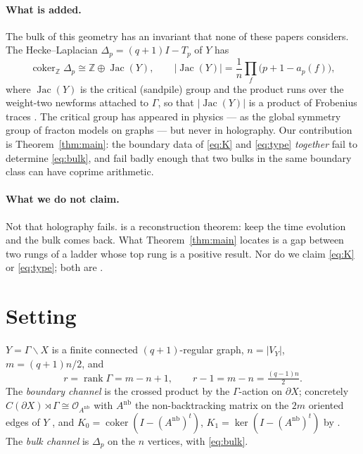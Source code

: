 \documentclass[11pt]{article}
\theoremstyle{plain}
\theoremstyle{remark}
\newcommand{\Z}{\mathbb{Z}}
\newcommand{\Jac}{\operatorname{Jac}}
\begin{document}
\paragraph{What is added.}
The bulk of this geometry has an invariant that none of these papers considers. The
Hecke--Laplacian $\Delta_p=(q{+}1)I-T_p$ of $Y$ has
\begin{equation}\label{eq:bulk}
\operatorname{coker}_\Z\Delta_p\cong\Z\oplus\Jac(Y),
\qquad
|\Jac(Y)|=\frac1n\prod_f\bigl(p+1-a_p(f)\bigr),
\end{equation}
where $\Jac(Y)$ is the critical (sandpile) group \cite{Biggs,BHN} and the product runs over
the weight-two newforms attached to $\Gamma$, so that $|\Jac(Y)|$ is a product of Frobenius
traces \cite[I]{ANCFT}. The critical group has appeared in physics --- as the global
symmetry group of fracton models on graphs \cite{GLS22,GLSS23} --- but never in holography.
Our contribution is Theorem~\ref{thm:main}: the boundary data of \eqref{eq:K} and
\eqref{eq:type} \emph{together} fail to determine \eqref{eq:bulk}, and fail badly enough
that two bulks in the same boundary class can have coprime arithmetic.

\paragraph{What we do not claim.}
Not that holography fails. \cite{CM13} is a reconstruction theorem: keep the time
evolution and the bulk comes back. What Theorem~\ref{thm:main} locates is a gap between two
rungs of a ladder whose top rung is a positive result. Nor do we claim \eqref{eq:K} or
\eqref{eq:type}; both are \cite{Rob05}.

\section{Setting}\label{sec:setting}

$Y=\Gamma\backslash X$ is a finite connected $(q{+}1)$-regular graph, $n=|V_Y|$,
$m=(q{+}1)n/2$, and
\[
r=\operatorname{rank}\Gamma=m-n+1,\qquad r-1=m-n=\tfrac{(q-1)n}{2}.
\]
The \emph{boundary channel} is the crossed product by the $\Gamma$-action on $\partial X$;
concretely $C(\partial X)\rtimes\Gamma\cong\mathcal O_{A^{\mathrm{nb}}}$ with
$A^{\mathrm{nb}}$ the non-backtracking matrix on the $2m$ oriented edges of $Y$
\cite{Rob05}, and $K_0=\operatorname{coker}(I-(A^{\mathrm{nb}})^{t})$,
$K_1=\ker(I-(A^{\mathrm{nb}})^{t})$ by \cite{Cuntz81}. The \emph{bulk channel} is
$\Delta_p$ on the $n$ vertices, with \eqref{eq:bulk}.
\end{document}
